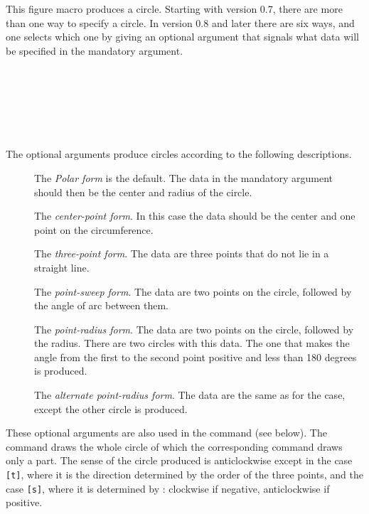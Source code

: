 \documentclass[letterpaper]{article}
\begin{document}
\begin{cd}
%
%
\end{cd}

This figure macro produces a circle. Starting with \mfp{} version 0.7,
there are more than one way to specify a circle. In version 0.8 and
later there are six ways, and one selects which one by giving
 an optional argument that signals what data will be
specified in the mandatory argument.

\begin{cd}
\\
\\
\\
\\
\\
%
%
\end{cd}

The optional arguments produce circles according to the following
descriptions.
\begin{description}
\item[] The \textit{Polar form} is the default. The data in the
mandatory argument should then be the center  and radius
 of the circle.

\item[] The \textit{center-point form}. In this case the data
should be the center and one point on the circumference.

\item[] The \textit{three-point form}. The data are three points
that do not lie in a straight line.

\item[] The \textit{point-sweep form}. The data are two points on the
circle, followed by the angle of arc between them.

\item[] The \textit{point-radius form}. The data are two points on the
circle, followed by the radius. There are two circles with this data.
The one that makes the angle from the first to the second point positive
and less than 180 degrees is produced.

\item[] The \textit{alternate point-radius form}. The data are
the same as for the  case, except the other circle is produced.
\end{description}
These optional arguments are also used in the  command (see
below). The  command draws the whole circle of which the
corresponding  command draws only a part. The sense of the
circle produced is anticlockwise except in the case \texttt{[t]}, where
it is the direction determined by the order of the three points, and the
case \texttt{[s]}, where it is determined by \meta{$\theta$}: clockwise
if negative, anticlockwise if positive.
\end{document}
